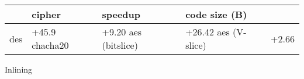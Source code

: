 \centering
  \begin{tabular}{|l K{2cm}|K{1.5cm}|K{2cm}|K{2cm}|}
    \hline
    & \textbf{cipher} & \textbf{speedup} & \textbf{code size (B)}\\
    \hline
    des & +45.9%
    \hline
    chacha20 & +9.20%
    \hline
    aes (bitslice) & +26.42%
    \hline
    aes (V-slice) & +2.66%
    \hline
    \end{tabular}
  \caption{Inlining}
  \label{tbl:perf-inlining}